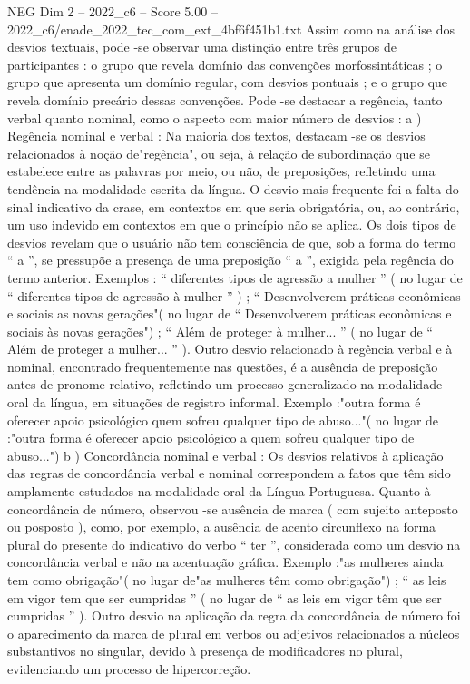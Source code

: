 \begin{textsample}{NEG Dim 2 – 2022\_c6 – Score 5.00 – 2022\_c6/enade\_2022\_tec\_com\_ext\_4bf6f451b1.txt}
Assim como na análise dos desvios textuais, pode -se observar uma distinção entre três grupos de participantes : o grupo que revela domínio das convenções morfossintáticas ; o grupo que apresenta um domínio regular, com desvios pontuais ; e o grupo que revela domínio precário dessas convenções.
Pode -se destacar a regência, tanto verbal quanto nominal, como o aspecto com maior número de desvios : a ) Regência nominal e verbal : Na maioria dos textos, destacam -se os desvios relacionados à noção de"regência", ou seja, à relação de subordinação que se estabelece entre as palavras por meio, ou não, de preposições, refletindo uma tendência na modalidade escrita da língua.
O desvio mais frequente foi a falta do sinal indicativo da crase, em contextos em que seria obrigatória, ou, ao contrário, um uso indevido em contextos em que o princípio não se aplica.
Os dois tipos de desvios revelam que o usuário não tem consciência de que, sob a forma do termo “ a ”, se pressupõe a presença de uma preposição “ a ”, exigida pela regência do termo anterior.
Exemplos : “ diferentes tipos de agressão a mulher ” ( no lugar de “ diferentes tipos de agressão à mulher ” ) ; “ Desenvolverem práticas econômicas e sociais as novas gerações"( no lugar de “ Desenvolverem práticas econômicas e sociais às novas gerações") ; “ Além de proteger à mulher... ” ( no lugar de “ Além de proteger a mulher... ” ).
Outro desvio relacionado à regência verbal e à nominal, encontrado frequentemente nas questões, é a ausência de preposição antes de pronome relativo, refletindo um processo generalizado na modalidade oral da língua, em situações de registro informal.
Exemplo :"outra forma é oferecer apoio psicológico quem sofreu qualquer tipo de abuso..."( no lugar de :"outra forma é oferecer apoio psicológico a quem sofreu qualquer tipo de abuso...") b ) Concordância nominal e verbal : Os desvios relativos à aplicação das regras de concordância verbal e nominal correspondem a fatos que têm sido amplamente estudados na modalidade oral da Língua Portuguesa.
Quanto à concordância de número, observou -se ausência de marca ( com sujeito anteposto ou posposto ), como, por exemplo, a ausência de acento circunflexo na forma plural do presente do indicativo do verbo “ ter ”, considerada como um desvio na concordância verbal e não na acentuação gráfica.
Exemplo :"as mulheres ainda tem como obrigação"( no lugar de"as mulheres têm como obrigação") ; “ as leis em vigor tem que ser cumpridas ” ( no lugar de “ as leis em vigor têm que ser cumpridas ” ).
Outro desvio na aplicação da regra da concordância de número foi o aparecimento da marca de plural em verbos ou adjetivos relacionados a núcleos substantivos no singular, devido à presença de modificadores no plural, evidenciando um processo de hipercorreção.

\end{textsample}
